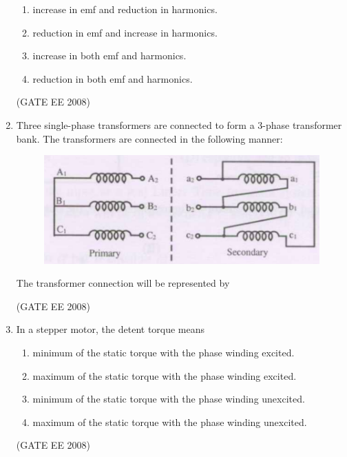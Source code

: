 \documentclass[journal,12pt,onecolumn]{IEEEtran}
\theoremstyle{remark}
\begin{document}
\begin{enumerate}[start=1, label=Q.\arabic*]
\begin{enumerate}[label=(\Alph*)]
    \item increase in emf and reduction in harmonics.
    \item reduction in emf and increase in harmonics.
    \item increase in both emf and harmonics.
    \item reduction in both emf and harmonics.
\end{enumerate}
\hfill (GATE EE 2008)



\item Three single-phase transformers are connected to form a 3-phase transformer bank. 
The transformers are connected in the following manner: 
\begin{figure}[H]
    \centering
    \includegraphics[width=\columnwidth]{Fig/q12.png}
    \label{fig:placeholder}
\end{figure}

The transformer connection will be represented by

\begin{enumerate}[label=(\Alph*)]
\hfill (GATE EE 2008)
\end{enumerate}



\item In a stepper motor, the detent torque means
\begin{enumerate}[label=(\Alph*)]
    \item minimum of the static torque with the phase winding excited.
    \item maximum of the static torque with the phase winding excited.
    \item minimum of the static torque with the phase winding unexcited.
    \item maximum of the static torque with the phase winding unexcited.
\end{enumerate}
\hfill (GATE EE 2008)




\end{enumerate}
\end{document}
